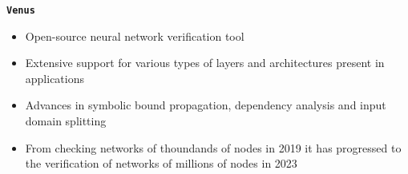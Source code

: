 \documentclass[10pt]{beamer}
\newcommand\blfootnote[1]{%
  \begingroup
  \renewcommand\thefootnote{}\footnote{#1}%
  \addtocounter{footnote}{-1}%
  \endgroup
}
\begin{document}
	






\begin{frame}{\texttt{{\bf Venus}}}

\begin{itemize}  \itemsep 1em
    \item Open-source neural network verification tool 

    \item Extensive support for various types of layers and architectures
        present in applications
    
    \item Advances in symbolic bound propagation,
        dependency analysis and input domain splitting

    \item From checking networks of thoundands of nodes in 2019 it has
        progressed to the verification of networks of millions of nodes in 2023
    \vspace{1em}
    \begin{figure}
    \end{figure}
\end{itemize}
\end{frame}

\end{document}
